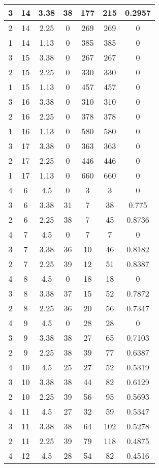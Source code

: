 \documentclass[letterpaper, 12pt]{article}
\begin{document}
\begin{longtable}{|c|c|c|c|c|c|c|}
\hline
3 & 14 & 3.38 & 38 & 177 & 215 & 0.2957 \\
\hline
2 & 14 & 2.25 & 0 & 269 & 269 & 0 \\
\hline
1 & 14 & 1.13 & 0 & 385 & 385 & 0 \\
\hline
3 & 15 & 3.38 & 0 & 267 & 267 & 0 \\
\hline
2 & 15 & 2.25 & 0 & 330 & 330 & 0 \\
\hline
1 & 15 & 1.13 & 0 & 457 & 457 & 0 \\
\hline
3 & 16 & 3.38 & 0 & 310 & 310 & 0 \\
\hline
2 & 16 & 2.25 & 0 & 378 & 378 & 0 \\
\hline
1 & 16 & 1.13 & 0 & 580 & 580 & 0 \\
\hline
3 & 17 & 3.38 & 0 & 363 & 363 & 0 \\
\hline
2 & 17 & 2.25 & 0 & 446 & 446 & 0 \\
\hline
1 & 17 & 1.13 & 0 & 660 & 660 & 0 \\
\hline
4 & 6 & 4.5 & 0 & 3 & 3 & 0 \\
\hline
3 & 6 & 3.38 & 31 & 7 & 38 & 0.775 \\
\hline
2 & 6 & 2.25 & 38 & 7 & 45 & 0.8736 \\
\hline
4 & 7 & 4.5 & 0 & 7 & 7 & 0 \\
\hline
3 & 7 & 3.38 & 36 & 10 & 46 & 0.8182 \\
\hline
2 & 7 & 2.25 & 39 & 12 & 51 & 0.8387 \\
\hline
4 & 8 & 4.5 & 0 & 18 & 18 & 0 \\
\hline
3 & 8 & 3.38 & 37 & 15 & 52 & 0.7872 \\
\hline
2 & 8 & 2.25 & 36 & 20 & 56 & 0.7347 \\
\hline
4 & 9 & 4.5 & 0 & 28 & 28 & 0 \\
\hline
3 & 9 & 3.38 & 38 & 27 & 65 & 0.7103 \\
\hline
2 & 9 & 2.25 & 38 & 39 & 77 & 0.6387 \\
\hline
4 & 10 & 4.5 & 25 & 27 & 52 & 0.5319 \\
\hline
3 & 10 & 3.38 & 38 & 44 & 82 & 0.6129 \\
\hline
2 & 10 & 2.25 & 39 & 56 & 95 & 0.5693 \\
\hline
4 & 11 & 4.5 & 27 & 32 & 59 & 0.5347 \\
\hline
3 & 11 & 3.38 & 38 & 64 & 102 & 0.5278 \\
\hline
2 & 11 & 2.25 & 39 & 79 & 118 & 0.4875 \\
\hline
4 & 12 & 4.5 & 28 & 54 & 82 & 0.4516 \\

\end{longtable}
\end{document}
